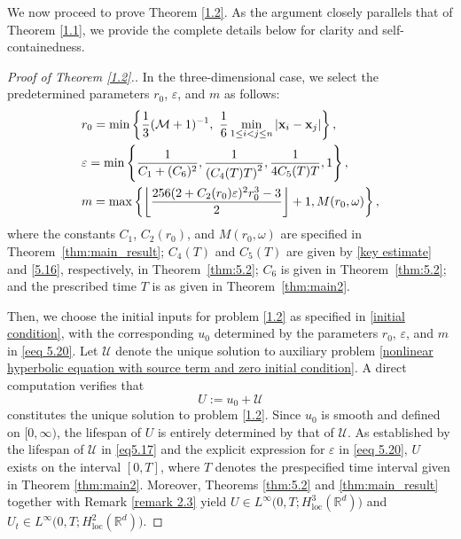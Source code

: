 \documentclass[11pt,reqno,oneside]{amsart}
\numberwithin{equation}{section}
\theoremstyle{definition}
\theoremstyle{remark}
\numberwithin{equation}{section}
\begin{document}
We now proceed to prove Theorem \ref{1.2}. As the argument closely parallels that of Theorem \ref{1.1}, we provide the complete details below for clarity and self-containedness.
\begin{proof}[Proof of Theorem \ref{1.2}.]\label{proof 1.2}
	In the three-dimensional case, we select the predetermined parameters $r_0$, $\varepsilon$, and $m$ as follows:
	\begin{equation}\label{eeq 5.20}
		\begin{aligned}
			&\hfill r_0 = \min\left\{\frac{1}{3}(\mathcal{M} + 1)^{-1},\ \frac{1}{6}\min_{1 \leq i < j \leq n} |\mathbf{x}_i - \mathbf{x}_j|\right\}, \\
			&\hfill \varepsilon = \min\left\{\frac{1}{C_1 + (C_6)^2},\frac{1}{\left(C_4(T)T\right)^2},\frac{1}{4C_5(T)T},1\right\}, \\
			&\hfill m = \max\left\{ \left\lfloor \frac{256(2+C_2(r_0)\varepsilon)^2r_{0}^{3}-3}{2} \right\rfloor + 1,  M(r_0,\omega) \right\},
		\end{aligned}
	\end{equation}
	where the constants $C_1$, $C_2(r_0)$, and $M(r_0,\omega)$ are specified in Theorem~\ref{thm:main_result}; $C_4(T)$ and $C_5(T)$ are given by \eqref{key estimate} and \eqref{5.16}, respectively, in Theorem~\ref{thm:5.2}; $C_6$ is given in Theorem~\ref{thm:5.2}; and the prescribed time $T$ is as given in Theorem~\ref{thm:main2}.
	
	Then, we choose the initial inputs for problem \eqref{1.2} as specified in \eqref{initial condition}, with the corresponding $u_0$ determined by the parameters $r_0$, $\varepsilon$, and $m$ in \eqref{eeq 5.20}. Let $\mathscr{U}$ denote the unique solution to auxiliary problem \eqref{nonlinear hyperbolic equation with source term and zero initial condition}. A direct computation verifies that
	\begin{equation}\label{eq 5.21}
		U := u_0 + \mathscr{U}
	\end{equation}
	constitutes the unique solution to problem \eqref{1.2}. Since $u_0$ is smooth and defined on $[0,\infty)$, the lifespan of $U$ is entirely determined by that of $\mathscr{U}$. As established by the lifespan of $\mathscr{U}$ in \eqref{eq5.17} and the explicit expression for $\varepsilon$ in \eqref{eeq 5.20}, $U$ exists on the interval $[0,T]$, where $T$ denotes the prespecified time interval given in Theorem \ref{thm:main2}. Moreover, Theorems \ref{thm:5.2} and \ref{thm:main_result} together with Remark \ref{remark 2.3} yield $U \in L^{\infty}\big(0,T;H^{3}_{\text{loc}}(\mathbb{R}^d)\big)$ and $U_t \in L^{\infty}\big(0,T;H^{2}_{\text{loc}}(\mathbb{R}^d)\big)$.
	

\end{proof}
\end{document}

